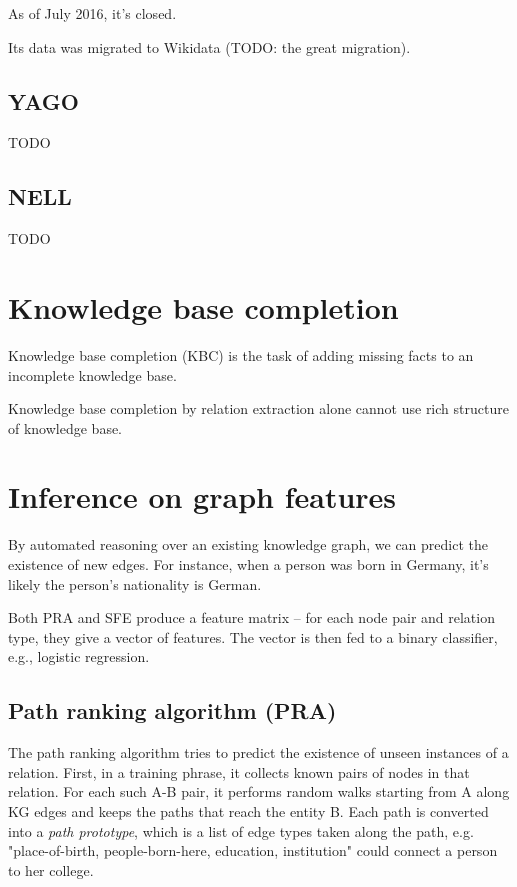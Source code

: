 As of July 2016, it's closed.

Its data was migrated to Wikidata (TODO: the great migration).

\subsection{YAGO}

TODO

\subsection{NELL}

TODO

\section{Knowledge base completion}

Knowledge base completion (KBC) is the task of adding missing facts to an
incomplete knowledge base.

Knowledge base completion by relation extraction alone cannot use rich structure
of knowledge base.

\section{Inference on graph features}

By automated reasoning over an existing knowledge graph, we can predict the
existence of new edges. For instance, when a person was born in Germany, it's
likely the person's nationality is German.

Both PRA and SFE produce a feature matrix -- for each node pair and relation
type, they give a vector of features. The vector is then fed to a binary
classifier, e.g., logistic regression.

\subsection{Path ranking algorithm (PRA)}
\label{path-ranking-algorithm}

The path ranking algorithm\cite{path-ranking-algorithm}
tries to predict the existence of unseen instances of a relation.
First, in a training phrase, it collects known pairs of nodes in that relation.
For each such A-B pair, it performs random walks starting from A along KG edges
and keeps the paths that reach the entity B. Each path is converted into a
\textit{path prototype}, which is a list of edge types taken along the path, e.g.
"place-of-birth, people-born-here, education, institution" could connect a
person to her college.

